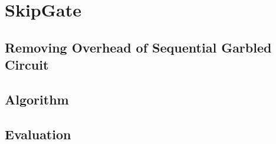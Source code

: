\chapter{SkipGate}
\section{Removing Overhead of Sequential Garbled Circuit}
\section{Algorithm}
\section{Evaluation}
